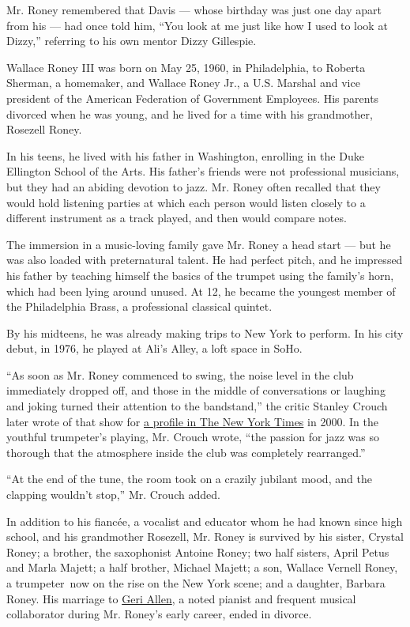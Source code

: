 Mr. Roney remembered that Davis --- whose birthday was just one day
apart from his --- had once told him, ``You look at me just like how I
used to look at Dizzy,'' referring to his own mentor Dizzy Gillespie.

Wallace Roney III was born on May 25, 1960, in Philadelphia, to Roberta
Sherman, a homemaker, and Wallace Roney Jr., a U.S. Marshal and vice
president of the American Federation of Government Employees. His
parents divorced when he was young, and he lived for a time with his
grandmother, Rosezell Roney.

In his teens, he lived with his father in Washington, enrolling in the
Duke Ellington School of the Arts. His father's friends were not
professional musicians, but they had an abiding devotion to jazz. Mr.
Roney often recalled that they would hold listening parties at which
each person would listen closely to a different instrument as a track
played, and then would compare notes.

The immersion in a music-loving family gave Mr. Roney a head start ---
but he was also loaded with preternatural talent. He had perfect pitch,
and he impressed his father by teaching himself the basics of the
trumpet using the family's horn, which had been lying around unused. At
12, he became the youngest member of the Philadelphia Brass, a
professional classical quintet.

By his midteens, he was already making trips to New York to perform. In
his city debut, in 1976, he played at Ali's Alley, a loft space in SoHo.

``As soon as Mr. Roney commenced to swing, the noise level in the club
immediately dropped off, and those in the middle of conversations or
laughing and joking turned their attention to the bandstand,'' the
critic Stanley Crouch later wrote of that show for
\href{https://www.nytimes3xbfgragh.onion/2000/09/24/arts/music-don-t-ask-the-critics-ask-wallace-roney-s-peers.html}{a
profile in The New York Times} in 2000. In the youthful trumpeter's
playing, Mr. Crouch wrote, ``the passion for jazz was so thorough that
the atmosphere inside the club was completely rearranged.''

``At the end of the tune, the room took on a crazily jubilant mood, and
the clapping wouldn't stop,'' Mr. Crouch added.

In addition to his fiancée, a vocalist and educator whom he had known
since high school, and his grandmother Rosezell, Mr. Roney is survived
by his sister, Crystal Roney; a brother, the saxophonist Antoine Roney;
two half sisters, April Petus and Marla Majett; a half brother, Michael
Majett; a son, Wallace Vernell Roney, a trumpeter~now on the rise on the
New York scene; and a daughter, Barbara Roney. His marriage to
\href{https://www.nytimes3xbfgragh.onion/2017/06/27/arts/music/geri-allen-dead-jazz.html}{Geri
Allen}, a noted pianist and frequent musical collaborator during Mr.
Roney's early career, ended in divorce.

